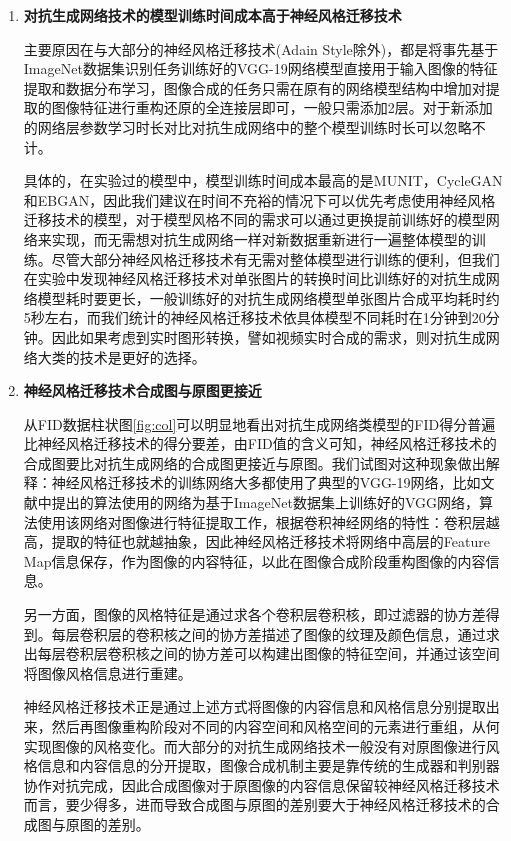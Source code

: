 \begin{enumerate}[itemindent=40pt, listparindent = 0.7cm, label={发现\arabic*:}]
    \item \textbf{对抗生成网络技术的模型训练时间成本高于神经风格迁移技术}
    
    主要原因在与大部分的神经风格迁移技术(Adain Style除外)，都是将事先基于ImageNet数据集识别任务训练好的VGG-19网络模型直接用于输入图像的特征提取和数据分布学习，图像合成的任务只需在原有的网络模型结构中增加对提取的图像特征进行重构还原的全连接层即可，一般只需添加2层。对于新添加的网络层参数学习时长对比对抗生成网络中的整个模型训练时长可以忽略不计。
    
    具体的，在实验过的模型中，模型训练时间成本最高的是MUNIT，CycleGAN和EBGAN，因此我们建议在时间不充裕的情况下可以优先考虑使用神经风格迁移技术的模型，对于模型风格不同的需求可以通过更换提前训练好的模型网络来实现，而无需想对抗生成网络一样对新数据重新进行一遍整体模型的训练。尽管大部分神经风格迁移技术有无需对整体模型进行训练的便利，但我们在实验中发现神经风格迁移技术对单张图片的转换时间比训练好的对抗生成网络模型耗时要更长，一般训练好的对抗生成网络模型单张图片合成平均耗时约5秒左右，而我们统计的神经风格迁移技术依具体模型不同耗时在1分钟到20分钟。因此如果考虑到实时图形转换，譬如视频实时合成的需求，则对抗生成网络大类的技术是更好的选择。 

    \item \textbf{神经风格迁移技术合成图与原图更接近}
    
    从FID数据柱状图\ref{fig:col}可以明显地看出对抗生成网络类模型的FID得分普遍比神经风格迁移技术的得分要差，由FID值的含义可知，神经风格迁移技术的合成图要比对抗生成网络的合成图更接近与原图。我们试图对这种现象做出解释：神经风格迁移技术的训练网络大多都使用了典型的VGG-19网络，比如文献\cite{nst}中提出的算法使用的网络为基于ImageNet数据集\cite{ImageNet}上训练好的VGG网络，算法使用该网络对图像进行特征提取工作，根据卷积神经网络的特性：卷积层越高，提取的特征也就越抽象，因此神经风格迁移技术将网络中高层的Feature Map信息保存，作为图像的内容特征，以此在图像合成阶段重构图像的内容信息。 

    另一方面，图像的风格特征是通过求各个卷积层卷积核，即过滤器的协方差得到。每层卷积层的卷积核之间的协方差描述了图像的纹理及颜色信息，通过求出每层卷积层卷积核之间的协方差可以构建出图像的特征空间，并通过该空间将图像风格信息进行重建。

    神经风格迁移技术正是通过上述方式将图像的内容信息和风格信息分别提取出来，然后再图像重构阶段对不同的内容空间和风格空间的元素进行重组，从何实现图像的风格变化。而大部分的对抗生成网络技术一般没有对原图像进行风格信息和内容信息的分开提取，图像合成机制主要是靠传统的生成器和判别器协作对抗完成，因此合成图像对于原图像的内容信息保留较神经风格迁移技术而言，要少得多，进而导致合成图与原图的差别要大于神经风格迁移技术的合成图与原图的差别。


\end{enumerate}
